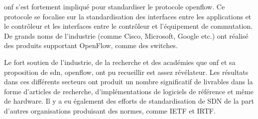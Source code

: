 \gls{onf} s'est fortement impliqué pour standardiser le protocole \gls{openflow}. Ce protocole se focalise sur la standardisation des interfaces entre les applications et le contrôleur et les interfaces entre le contrôleur et l'équipement de commutation. De grands noms de l'industrie (comme Cisco, Microsoft, Google etc.) ont réalisé des produits supportant OpenFlow, comme des switches. \cite{SurveySDNArchi} %




Le fort soutien de l'industrie, de la recherche et des académies que \gls{onf} et sa proposition de \gls{sdn}, \gls{openflow}, ont pu recueillir est assez révélateur. Les résultats dans ces différents secteurs ont produit un nombre significatif de livrables dans la forme d'articles de recherche, d'implémentations de logiciels de référence et même de hardware. Il y a eu également des efforts de standardisation de SDN de la part d'autres organisations produisant des normes, comme IETF et IRTF. \cite{SurveySDNIntro}


